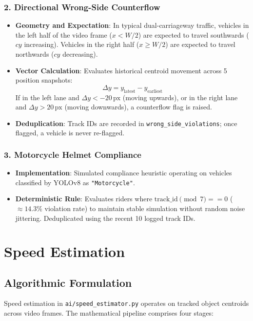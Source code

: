 \documentclass[11pt,a4paper,oneside]{report}
\begin{document}
\subsection{2. Directional Wrong-Side Counterflow}
\begin{itemize}[leftmargin=*]
    \item \textbf{Geometry and Expectation}: In typical dual-carriageway traffic, vehicles in the left half of the video frame ($x < W/2$) are expected to travel southwards ($cy$ increasing). Vehicles in the right half ($x \ge W/2$) are expected to travel northwards ($cy$ decreasing).
    \item \textbf{Vector Calculation}: Evaluates historical centroid movement across 5 position snapshots:
    \begin{equation}
    \Delta y = y_{\text{latest}} - y_{\text{earliest}}
    \end{equation}
    If in the left lane and $\Delta y < -20\,\text{px}$ (moving upwards), or in the right lane and $\Delta y > 20\,\text{px}$ (moving downwards), a counterflow flag is raised.
    \item \textbf{Deduplication}: Track IDs are recorded in \texttt{wrong\_side\_violations}; once flagged, a vehicle is never re-flagged.
\end{itemize}

\subsection{3. Motorcycle Helmet Compliance}
\begin{itemize}[leftmargin=*]
    \item \textbf{Implementation}: Simulated compliance heuristic operating on vehicles classified by YOLOv8 as \texttt{"Motorcycle"}.
    \item \textbf{Deterministic Rule}: Evaluates riders where $\text{track\_id} \pmod 7 == 0$ ($\approx 14.3\%$ violation rate) to maintain stable simulation without random noise jittering. Deduplicated using the recent 10 logged track IDs.
\end{itemize}



\chapter{Speed Estimation}

\section{Algorithmic Formulation}
Speed estimation in \texttt{ai/speed\_estimator.py} operates on tracked object centroids across video frames. The mathematical pipeline comprises four stages:
\end{document}
